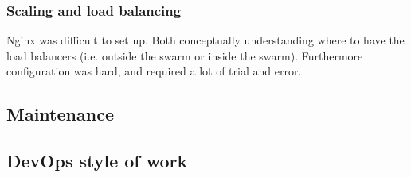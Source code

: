 \subsubsection{Scaling and load balancing}
Nginx was difficult to set up. Both conceptually understanding where to have the load balancers (i.e. outside the swarm or inside the swarm).
Furthermore configuration was hard, and required a lot of trial and error.\\


\subsection{Maintenance}

\subsection{DevOps style of work}